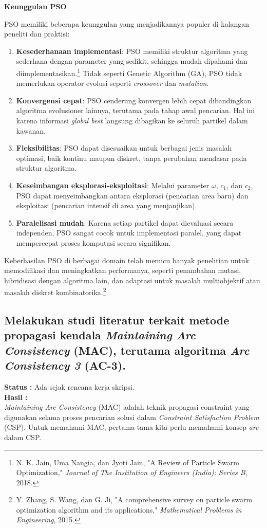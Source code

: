 \documentclass[a4paper,twoside]{article}
\begin{document}
	
	\textbf{Keunggulan PSO}
	
	PSO memiliki beberapa keunggulan yang menjadikannya populer di kalangan peneliti dan praktisi:
	
	\begin{enumerate}
		\item \textbf{Kesederhanaan implementasi}: PSO memiliki struktur algoritma yang sederhana dengan parameter yang sedikit, sehingga mudah dipahami dan diimplementasikan.\footnote{N. K. Jain, Uma Nangia, dan Jyoti Jain, "A Review of Particle Swarm Optimization," \textit{Journal of The Institution of Engineers (India): Series B}, 2018.} Tidak seperti Genetic Algorithm (GA), PSO tidak memerlukan operator evolusi seperti \textit{crossover} dan \textit{mutation}.
		
		\item \textbf{Konvergensi cepat}: PSO cenderung konvergen lebih cepat dibandingkan algoritma evolusioner lainnya, terutama pada tahap awal pencarian. Hal ini karena informasi \textit{global best} langsung dibagikan ke seluruh partikel dalam kawanan.
		
		\item \textbf{Fleksibilitas}: PSO dapat disesuaikan untuk berbagai jenis masalah optimasi, baik kontinu maupun diskret, tanpa perubahan mendasar pada struktur algoritma.
		
		\item \textbf{Keseimbangan eksplorasi-eksploitasi}: Melalui parameter $\omega$, $c_1$, dan $c_2$, PSO dapat menyeimbangkan antara eksplorasi (pencarian area baru) dan eksploitasi (pencarian intensif di area yang menjanjikan).
		
		\item \textbf{Paralelisasi mudah}: Karena setiap partikel dapat dievaluasi secara independen, PSO sangat cocok untuk implementasi paralel, yang dapat mempercepat proses komputasi secara signifikan.
	\end{enumerate}
	
	Keberhasilan PSO di berbagai domain telah memicu banyak penelitian untuk memodifikasi dan meningkatkan performanya, seperti penambahan mutasi, hibridisasi dengan algoritma lain, dan adaptasi untuk masalah multiobjektif atau masalah diskret kombinatorika.\footnote{Y. Zhang, S. Wang, dan G. Ji, "A comprehensive survey on particle swarm optimization algorithm and its applications," \textit{Mathematical Problems in Engineering}, 2015.}
	
	\subsection{Melakukan studi literatur terkait metode propagasi kendala \textit{Maintaining Arc Consistency} (MAC), terutama algoritma \textit{Arc Consistency 3} (AC-3).}
	{\bf Status :} Ada sejak rencana kerja skripsi.\\
	{\bf Hasil :}\\
	\textit{Maintaining Arc Consistency} (MAC) adalah teknik propagasi constraint yang digunakan selama proses pencarian solusi dalam \textit{Constraint Satisfaction Problem} (CSP). Untuk memahami MAC, pertama-tama kita perlu memahami konsep \textit{arc} dalam CSP.
	
\end{document}
